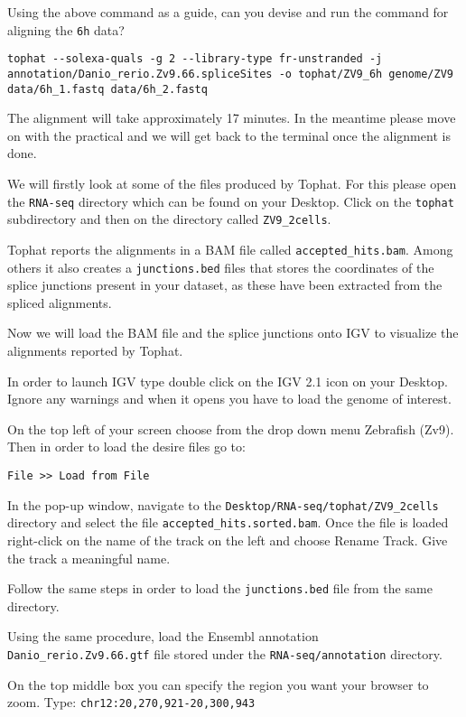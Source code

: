 \begin{questions}
Using the above command as a guide, can you
devise and run the command for aligning the \texttt{6h} data?
\begin{answer}
\begin{lstlisting}
tophat --solexa-quals -g 2 --library-type fr-unstranded -j annotation/Danio_rerio.Zv9.66.spliceSites -o tophat/ZV9_6h genome/ZV9 data/6h_1.fastq data/6h_2.fastq
\end{lstlisting}
\end{answer}

\begin{warning}
The alignment will take approximately 17 minutes. In the meantime please move
on with the practical and we will get back to the terminal once the alignment
is done.
\end{warning}

\end{questions}

\begin{steps}
We will firstly look at some of the files produced by Tophat. For this please
open the \texttt{RNA-seq} directory which can be found on your Desktop. Click on the \texttt{tophat}
subdirectory and then on the directory called \texttt{ZV9\_2cells}.

Tophat reports the alignments in a BAM file called \texttt{accepted\_hits.bam}.
Among others it also creates a \texttt{junctions.bed} files that stores the coordinates
of the splice junctions present in your dataset, as these have been extracted
from the spliced alignments.

Now we will load the BAM file and the splice junctions onto IGV to visualize
the alignments reported by Tophat.

In order to launch IGV type double click on the IGV 2.1 icon on your Desktop.
Ignore any warnings and when it opens you have to load the genome of interest.

On the top left of your screen choose from the drop down menu Zebrafish (Zv9).
Then in order to load the desire files go to:

\begin{lstlisting}
File >> Load from File
\end{lstlisting}

In the pop-up window, navigate to the \texttt{Desktop/RNA-seq/tophat/ZV9\_2cells}
directory
and select the file \texttt{accepted\_hits.sorted.bam}. Once the file is loaded
right-click on the name of the track on the left and choose Rename Track. Give
the track a meaningful name.

Follow the same steps in order to load the \texttt{junctions.bed} file from the same
directory.

Using the same procedure, load the Ensembl annotation
\texttt{Danio\_rerio.Zv9.66.gtf} file stored under the \texttt{RNA-seq/annotation}
directory.

On the top middle box you can specify the region you want your browser to
zoom. Type: \texttt{chr12:20,270,921-20,300,943}
\end{steps}

